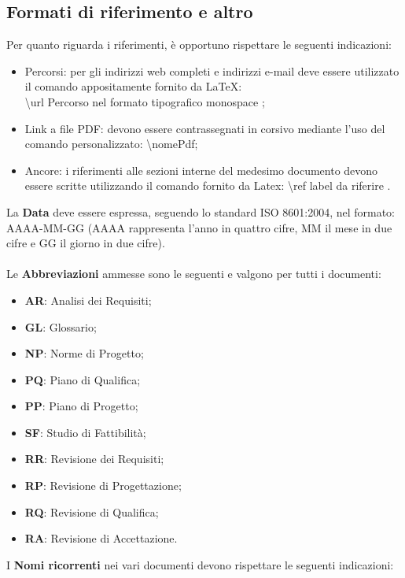 {		\subsection{Formati di riferimento e altro}{
			\label{sub:rif}
			Per quanto riguarda i riferimenti, \`{e} opportuno rispettare le seguenti indicazioni:
			\begin{itemize}
				\item Percorsi: per gli indirizzi web completi e indirizzi e-mail deve essere utilizzato il comando appositamente fornito da \LaTeX:\\ \textbackslash url \textbraceleft Percorso nel formato tipografico monospace \textbraceright;
				\item Link a file PDF: devono essere contrassegnati in corsivo mediante l’uso del comando personalizzato: \textbackslash nomePdf;
				\item Ancore: i riferimenti alle sezioni interne del medesimo documento devono essere scritte utilizzando il comando fornito da Latex: \textbackslash ref \textbraceleft label da riferire \textbraceright .
			\end{itemize}
			La \textbf{Data} deve essere espressa, seguendo lo standard ISO 8601:2004, nel formato: AAAA-MM-GG (AAAA rappresenta l'anno in quattro cifre, MM il mese in due cifre e GG il giorno in due cifre).\\
			\\
			Le \textbf{Abbreviazioni} ammesse sono le seguenti e valgono per tutti i documenti:
			\begin{itemize}
				\item \textbf{AR}: Analisi dei Requisiti;
				\item \textbf{GL}: Glossario;
				\item \textbf{NP}: Norme di Progetto;
				\item \textbf{PQ}: Piano di Qualifica;
				\item \textbf{PP}: Piano di Progetto;
				\item \textbf{SF}: Studio di Fattibilit\`{a};
				\item \textbf{RR}: Revisione dei Requisiti;
				\item \textbf{RP}: Revisione di Progettazione;
				\item \textbf{RQ}: Revisione di Qualifica;
				\item \textbf{RA}: Revisione di Accettazione.
			\end{itemize}
			I \textbf{Nomi ricorrenti} nei vari documenti devono rispettare le seguenti indicazioni:
}}

